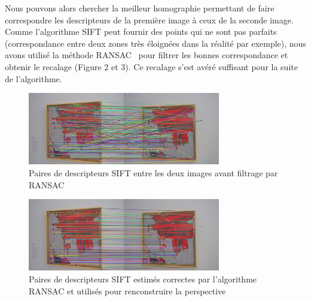 \documentclass[12pt,a4paper]{article}
\begin{document}
Nous pouvons alors chercher la meilleur homographie permettant de faire correspondre les descripteurs de la première image à ceux de la seconde image. Comme l'algorithme SIFT peut fournir des points qui ne sont pas parfaits (correspondance entre deux zones très éloignées dans la réalité par exemple), nous avons utilisé la méthode RANSAC~\citep{fischler1981random} pour filtrer les bonnes correspondance et obtenir le recalage (Figure 2 et 3). Ce recalage s'est avéré suffisant pour la suite de l'algorithme.

\begin{figure}[H]
  \centering
  \includegraphics[width=0.75\textwidth]{Fig/sift_raw.png}
  \caption{Paires de descripteurs SIFT entre les deux images avant filtrage par RANSAC}
\end{figure}

\begin{figure}[H]
  \centering
  \includegraphics[width=0.75\textwidth]{Fig/sift_ransac.png}
  \caption{Paires de descripteurs SIFT estimés correctes par l'algorithme RANSAC et utilisés pour renconstruire la perspective}
\end{figure}
\end{document}
